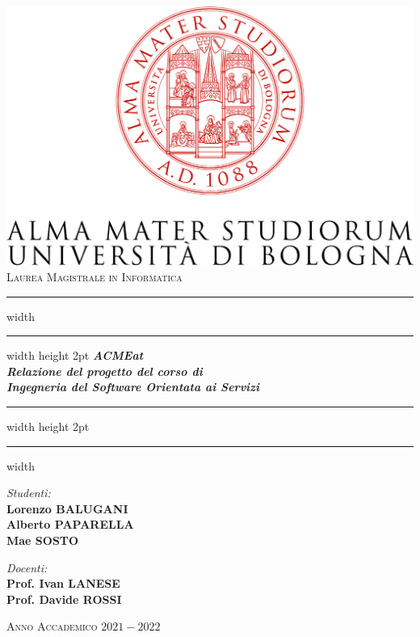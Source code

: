 \documentclass[11pt]{article} %
\begin{document}

\begin{titlepage}
	\centering
	\includegraphics[width=\textwidth]{logo.png}\\
	\vspace*{1cm}
	\Large \textsc{Laurea Magistrale in Informatica}
	
	\vspace*{10mm}
	\hrule width \hsize \kern 1mm \hrule width \hsize height 2pt
	\vspace*{5mm}
	\Huge \emph{\textbf{ACMEat}}\\
	\large \emph{\textbf{Relazione del progetto del corso di\\Ingegneria del Software Orientata ai Servizi}}\\
	\vspace*{5mm}
	\hrule width \hsize height 2pt
	\vspace*{1mm}
	\hrule width \hsize \kern 1mm
	
	\vspace*{10mm}
	\begin{minipage}{0.45\textwidth}
		\begin{flushleft} \Large
			\emph{Studenti:}\\
			\Large \textbf{Lorenzo \textsc{BALUGANI}}\\
			\Large \textbf{Alberto \textsc{PAPARELLA}}\\
			\Large \textbf{Mae \textsc{SOSTO}}
		\end{flushleft}
	\end{minipage}	
	\begin{minipage}{0.45\textwidth}
		\begin{flushright} \Large
			\emph{Docenti:}\\
			\Large \textbf{Prof. Ivan \textsc{LANESE}}\\
			\Large \textbf{Prof. Davide \textsc{ROSSI}}
		\end{flushright}
	\end{minipage}
	
	\vspace*{15mm}
	\Large \textsc{Anno Accademico $2021-2022$}
\end{titlepage}
\end{document}

